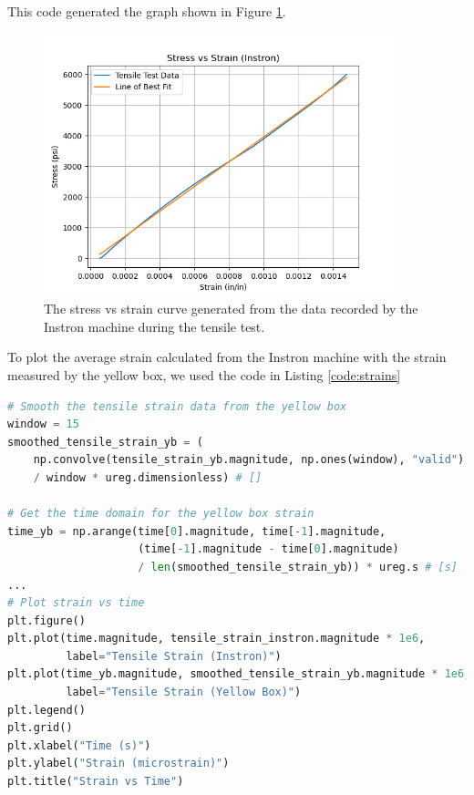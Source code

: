 \documentclass[12 pt]{report}
\begin{document}
\begin{parlist}
	This code generated the graph shown in Figure \ref{fig:stress_strain_instron}.
	
	\begin{figure}[htbp]
		\centering
		\includegraphics[width=4in]{images/graphs/Stress vs Strain Instron}
		\caption{The stress vs strain curve generated from the data recorded by the Instron machine during the tensile test.}
		\label{fig:stress_strain_instron}
	\end{figure}
	
	\item To plot the average strain calculated from the Instron machine with the strain measured by the yellow box, we used the code in Listing \ref{code:strains}
	
	\begin{lstlisting}[label={code:strains}, caption={The code used to plot the two strain measurements---one from the Instron machine and the other from the NI USB-6000---in the same graph.},language=Python]
# Smooth the tensile strain data from the yellow box
window = 15
smoothed_tensile_strain_yb = (
    np.convolve(tensile_strain_yb.magnitude, np.ones(window), "valid")
    / window * ureg.dimensionless) # []

# Get the time domain for the yellow box strain
time_yb = np.arange(time[0].magnitude, time[-1].magnitude,
                    (time[-1].magnitude - time[0].magnitude)
                    / len(smoothed_tensile_strain_yb)) * ureg.s # [s]
...
# Plot strain vs time
plt.figure()
plt.plot(time.magnitude, tensile_strain_instron.magnitude * 1e6,
         label="Tensile Strain (Instron)")
plt.plot(time_yb.magnitude, smoothed_tensile_strain_yb.magnitude * 1e6,
         label="Tensile Strain (Yellow Box)")
plt.legend()
plt.grid()
plt.xlabel("Time (s)")
plt.ylabel("Strain (microstrain)")
plt.title("Strain vs Time")\end{lstlisting}


\end{parlist}
\end{document}
